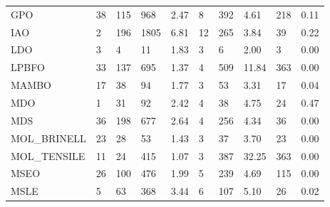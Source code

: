 \begin{tabular}{llllllllll}
GPO                         &                         38 &                        115 &             968 &           2.47 &              8 &               392 &             4.61 &              218 &         0.11 \\
IAO                         &                          2 &                        196 &            1805 &           6.81 &             12 &               265 &             3.84 &               39 &         0.22 \\
LDO                         &                          3 &                          4 &              11 &           1.83 &              3 &                 6 &             2.00 &                3 &         0.00 \\
LPBFO                       &                         33 &                        137 &             695 &           1.37 &              4 &               509 &            11.84 &              363 &         0.00 \\
MAMBO                       &                         17 &                         38 &              94 &           1.77 &              3 &                53 &             3.31 &               17 &         0.04 \\
MDO                         &                          1 &                         31 &              92 &           2.42 &              4 &                38 &             4.75 &               24 &         0.47 \\
MDS                         &                         36 &                        198 &             677 &           2.64 &              4 &               256 &             4.34 &               36 &         0.00 \\
MOL\_BRINELL                 &                         23 &                         28 &              53 &           1.43 &              3 &                37 &             3.70 &               23 &         0.00 \\
MOL\_TENSILE                 &                         11 &                         24 &             415 &           1.07 &              3 &               387 &            32.25 &              363 &         0.00 \\
MSEO                        &                         26 &                        100 &             476 &           1.99 &              5 &               239 &             4.69 &              115 &         0.00 \\
MSLE                        &                          5 &                         63 &             368 &           3.44 &              6 &               107 &             5.10 &               26 &         0.02 \\

\end{tabular}

